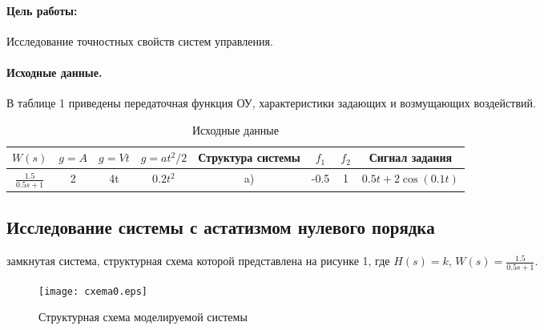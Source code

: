 \documentclass[12pt,a4paper]{article}
\begin{document}


\paragraph{Цель работы:}Исследование точностных свойств систем управления.%
\paragraph{Исходные данные.} В таблице 1 приведены передаточная функция ОУ, характеристики задающих и возмущающих воздействий.
\begin{table}[h!]
	\caption{Исходные данные}
	\renewcommand{\arraystretch}{1.8} %
	\begin{tabular}{|c|c|c|c|c|c|c|c|}
		\hline $W(s)$ & $g = A$ & $g = Vt$ & $g = at^2/2$ & Структура системы & $f_1$ & $f_2$ & Сигнал задания\\
		\hline $\displaystyle{\frac{1.5}{0.5s + 1}}$ & 2 & 4t & $0.2t^2$ & a) & -0.5 & 1 & $0.5t + 2\cos{(0.1t)}$\\
		\hline
	\end{tabular}	
\end{table} 

\newpage
\begin{center}
\section{Исследование системы с астатизмом нулевого порядка}
\end{center}
 замкнутая система, структурная схема которой представлена на рисунке 1, где $H(s) = k$, $W(s)=\displaystyle{\frac{1.5}{0.5s + 1}}$.
\begin{figure}[h!]
	\centering
	\texttt{[image: cxema0.eps]}
	\caption{Структурная схема моделируемой системы}
\end{figure}
\end{document}
